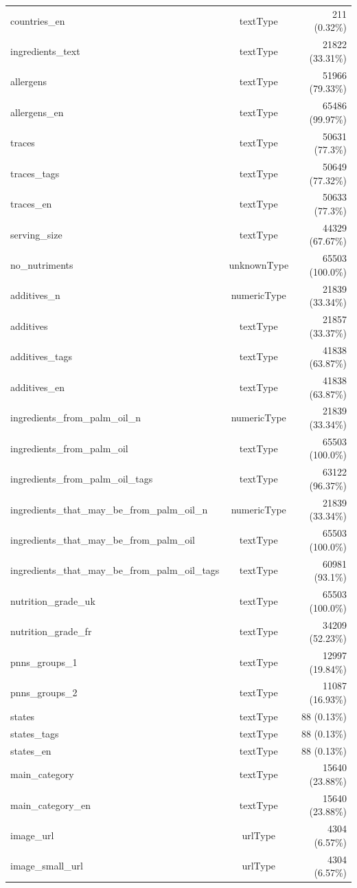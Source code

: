 \documentclass[11pt]{article}
\begin{document}
\begin{center}
\begin{longtable}{|l|c|r|}
countries\_en& textType& 211 (0.32\%)\\
ingredients\_text& textType& 21822 (33.31\%)\\
allergens& textType& 51966 (79.33\%)\\
allergens\_en& textType& 65486 (99.97\%)\\
traces& textType& 50631 (77.3\%)\\
traces\_tags& textType& 50649 (77.32\%)\\
traces\_en& textType& 50633 (77.3\%)\\
serving\_size& textType& 44329 (67.67\%)\\
no\_nutriments& unknownType& 65503 (100.0\%)\\
additives\_n& numericType& 21839 (33.34\%)\\
additives& textType& 21857 (33.37\%)\\
additives\_tags& textType& 41838 (63.87\%)\\
additives\_en& textType& 41838 (63.87\%)\\
ingredients\_from\_palm\_oil\_n& numericType& 21839 (33.34\%)\\
ingredients\_from\_palm\_oil& textType& 65503 (100.0\%)\\
ingredients\_from\_palm\_oil\_tags& textType& 63122 (96.37\%)\\
ingredients\_that\_may\_be\_from\_palm\_oil\_n& numericType& 21839 (33.34\%)\\
ingredients\_that\_may\_be\_from\_palm\_oil& textType& 65503 (100.0\%)\\
ingredients\_that\_may\_be\_from\_palm\_oil\_tags& textType& 60981 (93.1\%)\\
nutrition\_grade\_uk& textType& 65503 (100.0\%)\\
nutrition\_grade\_fr& textType& 34209 (52.23\%)\\
pnns\_groups\_1& textType& 12997 (19.84\%)\\
pnns\_groups\_2& textType& 11087 (16.93\%)\\
states& textType& 88 (0.13\%)\\
states\_tags& textType& 88 (0.13\%)\\
states\_en& textType& 88 (0.13\%)\\
main\_category& textType& 15640 (23.88\%)\\
main\_category\_en& textType& 15640 (23.88\%)\\
image\_url& urlType& 4304 (6.57\%)\\
image\_small\_url& urlType& 4304 (6.57\%)\\

\end{longtable}
\end{center}
\end{document}
